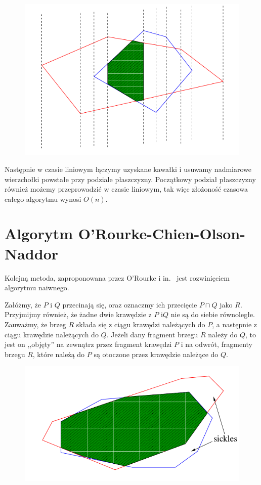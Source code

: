 \begin{figure}[htb]
  \centering
  \includegraphics[scale=0.5]{img/ShamosHoey76}
  \caption{\label{img:ShamosHoey76}}
\end{figure}

Następnie w czasie liniowym łączymy uzyskane kawałki i usuwamy
nadmiarowe wierzchołki powstałe przy podziale płaszczyzny. Początkowy
podział płaszczyzny również możemy przeprowadzić w czasie liniowym,
tak więc złożoność czasowa całego algorytmu wynosi $O(n)$.

\section{Algorytm O'Rourke-Chien-Olson-Naddor}
Kolejną metoda, zaproponowana przez O'Rourke i in.~\cite{Orourke98}
jest rozwinięciem algorytmu naiwnego.

Załóżmy, że $P$ i $Q$ przecinają się, oraz oznaczmy ich przecięcie $P
\cap Q$ jako $R$. Przyjmijmy również, że żadne dwie krawędzie z $P$
i$Q$ nie są do siebie równoległe. Zauważmy, że brzeg $R$ składa się z
ciągu krawędzi należących do $P$, a następnie z ciągu krawędzie
należących do $Q$. Jeżeli dany fragment brzegu $R$ należy do $Q$, to
jest on ,,objęty'' na zewnątrz przez fragment krawędzi $P$ i na
odwrót, fragmenty brzegu $R$, które należą do $P$ są otoczone przez
krawędzie należące do $Q$.

\begin{figure}[htb]
  \centering
  \includegraphics[scale=0.5]{img/Orourke98}
  \caption{\label{img:sickles}}
\end{figure}

